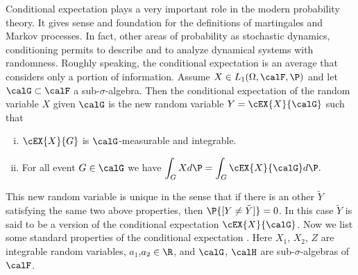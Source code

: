 
	Conditional expectation plays a very important role in the modern probability theory. It gives sense and 
foundation for the definitions of martingales and Markov processes. In fact, other areas of probability 
as stochastic dynamics, conditioning permits to describe and to analyze dynamical systems with randomness.
Roughly speaking, the conditional expectation is an average that considers only a portion of information.
Assume $X\in L_1(\Omega,\calF,\P)$ and let $\calG \subset \calF$ a sub-$\sigma$-algebra. Then the
conditional expectation of the random variable $X$ given $\calG$ is the new random variable 
$Y = \cEX{X}{\calG}$ such that
\begin{enumerate}[(i)]
	\item
		$\cEX{X}{G}$ is $\calG$-measurable and integrable.
	\item
		For all event $G\in \calG$ we have 
		$
			\displaystyle
			\int_{G} X d\P = \int_{G} \cEX{X}{\calG}d\P.
		$
\end{enumerate}
	This new random variable is unique in the sense that if there is an other $\tilde{Y}$ satisfying
the same two above properties, then $\P{[Y\neq \tilde{Y}]}=0$. In this case $\tilde{Y}$ is said to be 
a version of the conditional expectation $\cEX{X}{\calG}$.
Now we list some standard properties of the conditional expectation \cite{Williams1991}.
Here $X_1$, $X_2$, $Z$ are integrable random variables, $a_1$,$a_2\in \R$, and $\calG$, $\calH$ 
are sub-$\sigma$-algebras of $\calF$.
